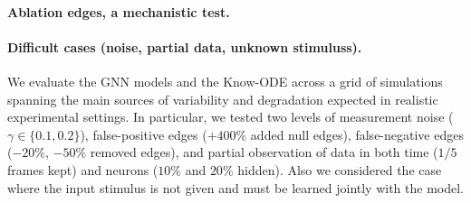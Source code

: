 \documentclass{article}
\begin{document}
\paragraph{Ablation edges, a mechanistic test.}








\paragraph{Difficult cases (noise, partial data, unknown stimuluss).}

We evaluate the GNN models and the Know-ODE across a grid of simulations spanning the main sources of variability and degradation expected in realistic experimental settings. In particular, we tested two levels of measurement noise
($\gamma \in \{0.1, 0.2\}$), false-positive edges ($+400\%$ added null edges),
false-negative edges ($-20\%$, $-50\%$  removed edges), and partial observation of data in both time ($1/5$ frames kept) and neurons ($10\%$ and $20\%$ hidden). Also we considered the case where the input stimulus is not given and must be learned jointly with the model.  
\end{document}
